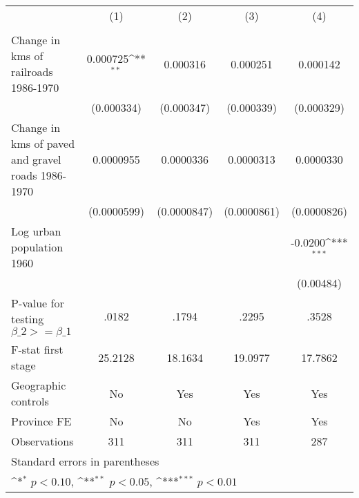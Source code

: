 {
\def\sym#1{\ifmmode^{#1}\else\(^{#1}\)\fi}
\begin{tabular}{l*{4}{c}}
\hline\hline
                &\multicolumn{1}{c}{(1)}&\multicolumn{1}{c}{(2)}&\multicolumn{1}{c}{(3)}&\multicolumn{1}{c}{(4)}\\
                &\multicolumn{1}{c}{}&\multicolumn{1}{c}{}&\multicolumn{1}{c}{}&\multicolumn{1}{c}{}\\
\hline
Change in kms of railroads 1986-1970& 0.000725\sym{**} & 0.000316         & 0.000251         & 0.000142         \\
                &(0.000334)         &(0.000347)         &(0.000339)         &(0.000329)         \\
[1em]
Change in kms of paved and gravel roads 1986-1970&0.0000955         &0.0000336         &0.0000313         &0.0000330         \\
                &(0.0000599)         &(0.0000847)         &(0.0000861)         &(0.0000826)         \\
[1em]
Log urban population 1960&                  &                  &                  &  -0.0200\sym{***}\\
                &                  &                  &                  &(0.00484)         \\
\hline
P-value for testing $\beta\_{2} >= \beta\_{1}$&    .0182         &    .1794         &    .2295         &    .3528         \\
F-stat first stage&  25.2128         &  18.1634         &  19.0977         &  17.7862         \\
Geographic controls&       No         &      Yes         &      Yes         &      Yes         \\
Province FE     &       No         &       No         &      Yes         &      Yes         \\
Observations    &      311         &      311         &      311         &      287         \\
\hline\hline
\multicolumn{5}{l}{\footnotesize Standard errors in parentheses}\\
\multicolumn{5}{l}{\footnotesize \sym{*} \(p<0.10\), \sym{**} \(p<0.05\), \sym{***} \(p<0.01\)}\\
\end{tabular}
}
